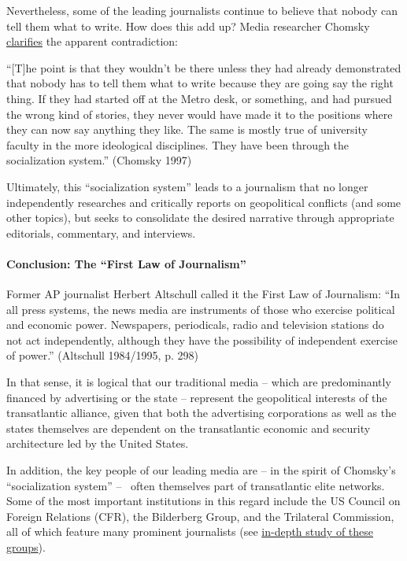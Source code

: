 Nevertheless, some of the leading journalists continue to believe that
nobody can tell them what to write. How does this add up? Media
researcher Chomsky \href{https://chomsky.info/199710__/}{clarifies} the
apparent contradiction:

``{[}T{]}he point is that they wouldn't be there unless they had already
demonstrated that nobody has to tell them what to write because they are
going say the right thing. If they had started off at the Metro desk, or
something, and had pursued the wrong kind of stories, they never would
have made it to the positions where they can now say anything they like.
The same is mostly true of university faculty in the more ideological
disciplines. They have been through the socialization system.'' (Chomsky
1997)

Ultimately, this ``socialization system'' leads to a journalism that no
longer independently researches and critically reports on geopolitical
conflicts (and some other topics), but seeks to consolidate the desired
narrative through appropriate editorials, commentary, and interviews.

\hypertarget{conclusion-the-first-law-of-journalism}{%
\paragraph{Conclusion: The ``First Law of
Journalism''}\label{conclusion-the-first-law-of-journalism}}

Former AP journalist Herbert Altschull called it the First Law of
Journalism: ``In all press systems, the news media are instruments of
those who exercise political and economic power. Newspapers,
periodicals, radio and television stations do not act independently,
although they have the possibility of independent exercise of power.''
(Altschull 1984/1995, p. 298)

In that sense, it is logical that our traditional media -- which are
predominantly financed by advertising or the state -- represent the
geopolitical interests of the transatlantic alliance, given that both
the advertising corporations as well as the states themselves are
dependent on the transatlantic economic and security architecture led by
the United States.

In addition, the key people of our leading media are -- in the spirit of
Chomsky's ``socialization system'' --~ often themselves part of
transatlantic elite networks. Some of the most important institutions in
this regard include the US Council on Foreign Relations (CFR), the
Bilderberg Group, and the Trilateral Commission, all of which feature
many prominent journalists (see
\href{https://swprs.org/the-american-empire-and-its-media/}{in-depth
study of these groups}).

